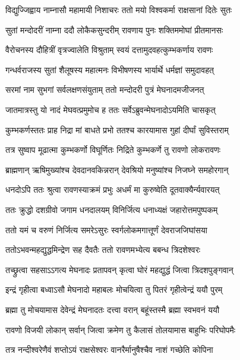 \twolineshloka
{विद्युज्जिह्वाय नाम्नासौ महामायी निशाचरः}
{ततो मयो विश्वकर्मा राक्षसानां दितेः सुतः} %

\twolineshloka
{सुतां मन्दोदरीं नाम्ना ददौ लोकैकसुन्दरीम्}
{रावणाय पुनः शक्तिममोघां प्रीतमानसः} %

\twolineshloka
{वैरोचनस्य दौहित्रीं वृत्रज्वालेति विश्रुताम्}
{स्वयं दत्तामुदवहत्कुम्भकर्णाय रावणः} %

\twolineshloka
{गन्धर्वराजस्य सुतां शैलूषस्य महात्मनः}
{विभीषणस्य भार्यार्थे धर्मज्ञां समुदावहत्} %

\twolineshloka
{सरमां नाम सुभगां सर्वलक्षणसंयुताम्}
{ततो मन्दोदरी पुत्रं मेघनादमजीजनत्} %

\twolineshloka
{जातमात्रस्तु यो नादं मेघवत्प्रमुमोच ह}
{ततः सर्वेऽब्रुवन्मेघनादोऽयमिति चासकृत्} %

\twolineshloka
{कुम्भकर्णस्ततः प्राह निद्रा मां बाधते प्रभो}
{ततश्च कारयामास गुहां दीर्घां सुविस्तराम्} %

\twolineshloka
{तत्र सुष्वाप मूढात्मा कुम्भकर्णो विघूर्णितः}
{निद्रिते कुम्भकर्णे तु रावणो लोकरावणः} %

\twolineshloka
{ब्राह्मणान् ऋषिमुख्यांश्च देवदानवकिन्नरान्}
{देवश्रियो मनुष्यांश्च निजघ्ने समहोरगान्} %

\twolineshloka
{धनदोऽपि ततः श्रुत्वा रावणस्याक्रमं प्रभुः}
{अधर्मं मा कुरुष्वेति दूतवाक्यैर्न्यवारयत्} %

\twolineshloka
{ततः क्रुद्धो दशग्रीवो जगाम धनदालयम्}
{विनिर्जित्य धनाध्यक्षं जहारोत्तमपुष्पकम्} %

\twolineshloka
{ततो यमं च वरुणं निर्जित्य समरेऽसुरः}
{स्वर्गलोकमगात्तूर्णं देवराजजिघांसया} %

\twolineshloka
{ततोऽभवन्महद्युद्धमिन्द्रेण सह दैवतैः}
{ततो रावणमभ्येत्य बबन्ध त्रिदशेश्वरः} %

\twolineshloka
{तच्छ्रुत्वा सहसाऽऽगत्य मेघनादः प्रतापवन्}
{कृत्वा घोरं महद्युद्धं जित्वा त्रिदशपुङ्गवान्} %

\twolineshloka
{इन्द्रं गृहीत्वा बध्वाऽसौ मेघनादो महाबलः}
{मोचयित्वा तु पितरं गृहीत्वेन्द्रं ययौ पुरम्} %

\twolineshloka
{ब्रह्मा तु मोचयामास देवेन्द्रं मेघनादतः}
{दत्त्वा वरान् बहूंस्तस्मै ब्रह्मा स्वभवनं ययौ} %

\twolineshloka
{रावणो विजयी लोकान् सर्वान् जित्वा क्रमेण तु}
{कैलासं तोलयामास बाहुभिः परिघोपमैः} %

\twolineshloka
{तत्र नन्दीश्वरेणैवं शप्तोऽयं राक्षसेश्वरः}
{वानरैर्मानुषैश्चैव नाशं गच्छेति कोपिना} %

